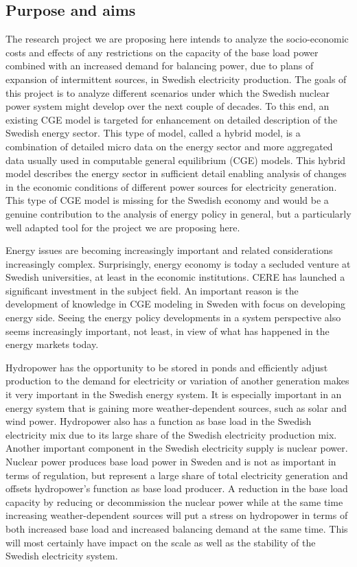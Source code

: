 \documentclass[10pt,a4paper]{article}
\begin{document}
\subsection{Purpose and aims}
The research project we are proposing here intends to analyze the socio-economic costs and effects of any restrictions on the capacity of the base load power combined with an increased demand for balancing power, due to plans of expansion of intermittent sources, in Swedish electricity production. The goals of this project is to analyze different scenarios under which the Swedish nuclear power system might develop over the next couple of decades. To this end, an existing CGE model is targeted for enhancement on detailed description of the Swedish energy sector. This type of model, called a hybrid model, is a combination of detailed micro data on the energy sector and more aggregated data usually used in computable general equilibrium (CGE) models. This hybrid model describes the energy sector in sufficient detail enabling analysis of changes in the economic conditions of different power sources for electricity generation. This type of CGE model is missing for the Swedish economy and would be a genuine contribution to the analysis of energy policy in general, but a particularly well adapted tool for the project we are proposing here.

Energy issues are becoming increasingly important and related considerations increasingly complex. Surprisingly, energy economy is today a secluded venture at Swedish universities, at least in the economic institutions. CERE has launched a significant investment in the subject field. An important reason is the development of knowledge in CGE modeling in Sweden with focus on developing energy side. Seeing the energy policy developments in a system perspective also seems increasingly important, not least, in view of what has happened in the energy markets today.

Hydropower has the opportunity to be stored in ponds and efficiently adjust production to the demand for electricity or variation of another generation makes it very important in the Swedish energy system. It is especially important in an energy system that is gaining more weather-dependent sources, such as solar and wind power. Hydropower also has a function as base load in the Swedish electricity mix due to its large share of the Swedish electricity production mix. Another important component in the Swedish electricity supply is nuclear power. Nuclear power produces base load power in Sweden and is not as important in terms of regulation, but represent a large share of total electricity generation and offsets hydropower's function as base load producer. A reduction in the base load capacity by reducing or decommission the nuclear power while at the same time increasing weather-dependent sources will put a stress on hydropower in terms of both increased base load and increased balancing demand at the same time. This will most certainly have impact on the scale as well as the stability of the Swedish electricity system.
\end{document}
